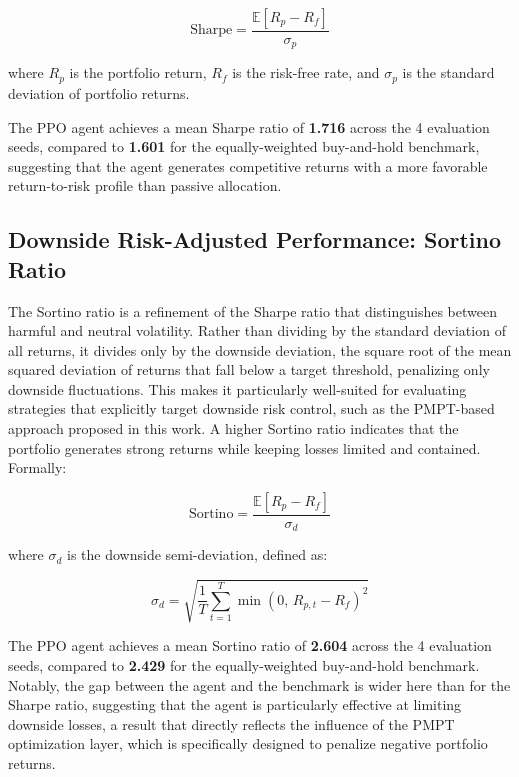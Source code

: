 \documentclass[final]{article}
\begin{document}
\begin{equation}
    \text{Sharpe} = \frac{\mathbb{E}[R_p - R_f]}{\sigma_p}
\end{equation}

where $R_p$ is the portfolio return, $R_f$ is the risk-free rate, and $\sigma_p$ is the standard deviation of portfolio returns.

The PPO agent achieves a mean Sharpe ratio of \textbf{1.716} across the 4 evaluation seeds, compared to \textbf{1.601}
for the equally-weighted buy-and-hold benchmark, suggesting that the agent generates competitive returns with a more
favorable return-to-risk profile than passive allocation.

\subsection{Downside Risk-Adjusted Performance: Sortino Ratio}
\label{sec:sortino}
The Sortino ratio is a refinement of the Sharpe ratio that distinguishes between harmful and neutral volatility. Rather
than dividing by the standard deviation of all returns, it divides only by the downside deviation, the square root
of the mean squared deviation of returns that fall below a target threshold, penalizing only downside fluctuations.
This makes it particularly well-suited for evaluating strategies that explicitly target downside risk control, such as
the PMPT-based approach proposed in this work. A higher Sortino ratio indicates that the portfolio generates strong
returns while keeping losses limited and contained.
Formally:

\begin{equation}
    \text{Sortino} = \frac{\mathbb{E}[R_p - R_f]}{\sigma_d}
\end{equation}

where $\sigma_d$ is the downside semi-deviation, defined as:

\begin{equation}
    \sigma_d = \sqrt{\frac{1}{T}\sum_{t=1}^{T} \min(0,\, R_{p,t} - R_f)^2}
\end{equation}

The PPO agent achieves a mean Sortino ratio of \textbf{2.604} across the 4 evaluation seeds, compared to \textbf{2.429}
for the equally-weighted buy-and-hold benchmark. Notably, the gap between the agent and the benchmark is wider here than
for the Sharpe ratio, suggesting that the agent is particularly effective at limiting downside losses, a result that directly
reflects the influence of the PMPT optimization layer, which is specifically designed to penalize negative portfolio returns.
\end{document}
